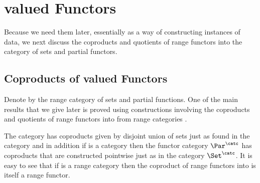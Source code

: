\section{\Par valued Functors}

 Because we need them later, essentially as a way of constructing 
 instances of data, we next discuss the coproducts and quotients of range functors into the category of sets and partial functors.

\subsection{Coproducts of \Par valued  Functors}
Denote by \Par the range category of sets and partial functions.
One of the main results that we give later is proved using constructions involving the coproducts and quotients of range functors into \Par from range categories \catcw. 

The category \Par has coproducts given by disjoint union of sets just as found in the category \Set and in addition if  \catcw is a category
then the functor category $\Par^\catc$  has coproducts that are constructed pointwise just as in the category $\Set^\catc$. It is easy to see that
if \catcw is a range category then the coproduct of range functors into \Par 
is itself a range functor.

